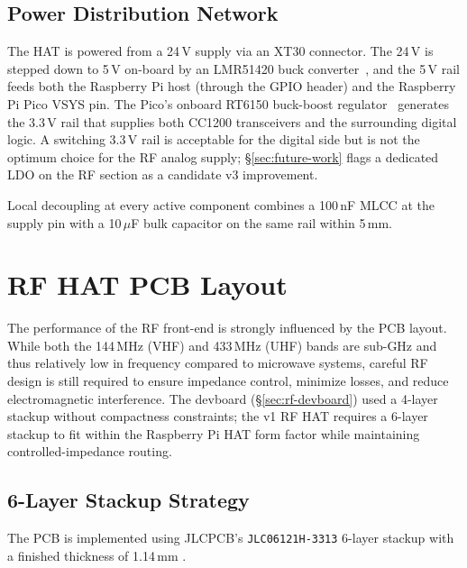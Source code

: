 \subsection{Power Distribution Network}

The HAT is powered from a 24\,V supply via an XT30 connector. The 24\,V is stepped down to 5\,V on-board by an LMR51420 buck converter~\cite{lmr51420}, and the 5\,V rail feeds both the Raspberry Pi host (through the GPIO header) and the Raspberry Pi Pico VSYS pin. The Pico's onboard RT6150 buck-boost regulator~\cite{rt6150} generates the 3.3\,V rail that supplies both CC1200 transceivers and the surrounding digital logic. A switching 3.3\,V rail is acceptable for the digital side but is not the optimum choice for the RF analog supply; \S\ref{sec:future-work} flags a dedicated LDO on the RF section as a candidate v3 improvement.

Local decoupling at every active component combines a 100\,nF MLCC at the supply pin with a 10\,$\mu$F bulk capacitor on the same rail within 5\,mm. 

\section{RF HAT PCB Layout}
\label{sec:rf-hat-layout}

The performance of the RF front-end is strongly influenced by the PCB layout. While both the 144\,MHz (VHF) and 433\,MHz (UHF) bands are sub-GHz and thus relatively low in frequency compared to microwave systems, careful RF design is still required to ensure impedance control, minimize losses, and reduce electromagnetic interference. The devboard (\S\ref{sec:rf-devboard}) used a 4-layer stackup without compactness constraints; the v1 RF HAT requires a 6-layer stackup to fit within the Raspberry Pi HAT form factor while maintaining controlled-impedance routing.

\subsection{6-Layer Stackup Strategy}

The PCB is implemented using JLCPCB's \texttt{JLC06121H-3313} 6-layer stackup with a finished thickness of 1.14\,mm \cite{jlcpcb_stackup}.

